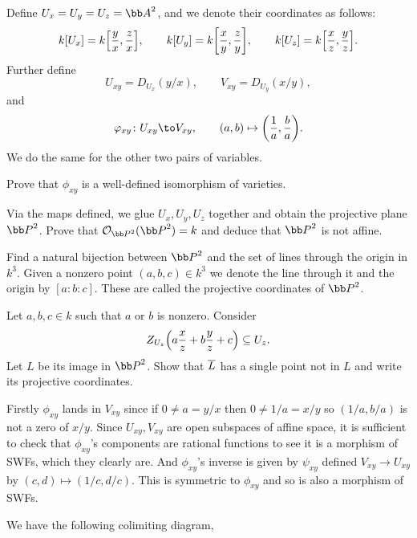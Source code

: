     Define $U_x=U_y=U_z=\bA^2$, and we denote their coordinates as follows:
    $$ k[U_x] = k\mathopen{}\mathclose{\left[{{y}\over{x}},{{z}\over{x}}\right]},\qquad k[U_y] = k\mathopen{}\mathclose{\left[{{x}\over{y}},{{z}\over{y}}\right]},\qquad 
    k[U_z] = k\mathopen{}\mathclose{\left[{{x}\over{z}},{{y}\over{z}}\right]} . $$
    Further define
    $$ U_{xy} = D_{U_x}(y/x),\qquad V_{xy} = D_{U_y}(x/y) , $$
    and
    $$ \phi_{xy}\colon U_{xy} \to V_{xy},\qquad (a,b)\mapsto \parens{\frac1a,\frac ba} . $$
    We do the same for the other two pairs of variables.
    \benum
        \item Prove that $\phi_{xy}$ is a well-defined isomorphism of varieties.
        \item Via the maps defined, we glue $U_x,U_y,U_z$ together and obtain the {\emphcolor projective plane} $\bP^2$.
        Prove that $\O_{\bP^2}(\bP^2)=k$ and deduce that $\bP^2$ is not affine.
        \item Find a natural bijection between $\bP^2$ and the set of lines through the origin in $k^3$.
        Given a nonzero point $(a,b,c)\in k^3$ we denote the line through it and the origin by $[a:b:c]$.
        These are called the {\emphcolor projective coordinates} of $\bP^2$.
        \item Let $a,b,c\in k$ such that $a$ or $b$ is nonzero.
        Consider
        $$ Z_{U_z}\mathopen{}\mathclose{\left(a{{x}\over{z}} + b{{y}\over{z}} + c\right)} \subseteq U_z . $$
        Let $L$ be its image in $\bP^2$.
        Show that ${\overline{L}}$ has a single point not in $L$ and write its projective coordinates.
    \eenum

\eprob

\benum
    \item Firstly $\phi_{xy}$ lands in $V_{xy}$ since if $0\neq a=y/x$ then $0\neq 1/a=x/y$ so $(1/a,b/a)$ is not a zero
    of $x/y$.
    Since $U_{xy},V_{xy}$ are open subspaces of affine space, it is sufficient to check that $\phi_{xy}$'s components
    are rational functions to see it is a morphism of SWFs, which they clearly are.
    And $\phi_{xy}$'s inverse is given by $\psi_{xy}$ defined $V_{xy}\to U_{xy}$ by $(c,d)\mapsto(1/c,d/c)$.
    This is symmetric to $\phi_{xy}$ and so is also a morphism of SWFs.
    
    \item We have the following colimiting diagram,

    \bigskip
    \centerline{}

